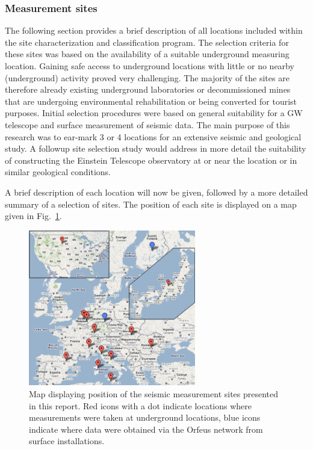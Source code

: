 \FloatBarrier
\subsubsection{Measurement sites}
The following section provides a brief description of all locations included within the site characterization and classification program. The selection criteria for these sites was based on the availability of a suitable underground measuring location. Gaining safe access to underground locations with little or no nearby (underground) activity proved very challenging. The majority of the sites are therefore already existing underground laboratories or decommissioned mines that are undergoing environmental rehabilitation or being converted for tourist purposes. Initial selection procedures were based on general suitability for a GW telescope and surface measurement of seismic data. The main purpose of this research was to ear-mark 3 or 4 locations for an extensive seismic and geological study. A followup site selection study would address in more detail the suitability of constructing the Einstein Telescope observatory at or near the location or in similar geological conditions.  

A brief description of each location will now be given, followed by a more detailed summary of a selection of sites. The position of each site is displayed on a map given in Fig.~\ref{Fig:map}.

\begin{figure}[h]
	\begin{center}
		\includegraphics[width=0.65\textwidth]{./Sec_SiteInfra/Figures/map2.png}\hspace{1pc}%
		\caption{Map displaying position of the seismic measurement sites presented in this report. Red icons with a dot indicate locations where measurements were taken at underground locations, blue icons indicate where data were obtained via the Orfeus network from surface installations.}
		\label{Fig:map}
	\end{center}
\end{figure}

